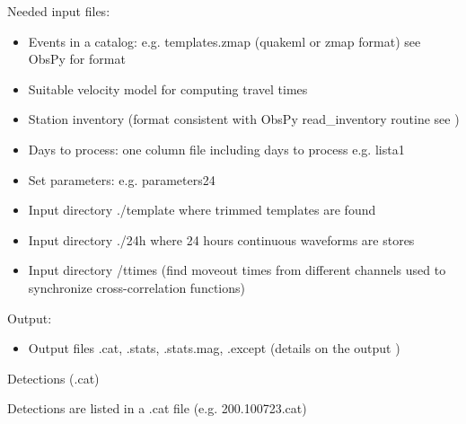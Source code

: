 \documentclass[a4paper,12pt,english]{sphinxmanual}
\begin{document}
Needed input files:
\begin{itemize}
\item {} 
Events in a catalog: e.g. templates.zmap (quakeml or zmap format) see ObsPy for format

\item {} 
Suitable velocity model for computing travel times

\item {} 
Station inventory (format consistent with ObsPy read\_inventory routine see )

\item {} 
Days to process: one column file including days to process e.g. lista1

\item {} 
Set parameters: e.g. parameters24

\item {} 
Input directory ./template where trimmed templates are found

\item {} 
Input directory ./24h where 24 hours continuous waveforms are stores

\item {} 
Input directory /ttimes (find moveout times from different channels used to synchronize cross-correlation functions)

\end{itemize}

Output:
\begin{itemize}
\item {} 
Output files .cat, .stats, .stats.mag, .except (details on the output )

\end{itemize}

Detections (.cat)

Detections are listed in a .cat file (e.g. 200.100723.cat)
\end{document}
